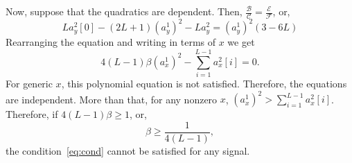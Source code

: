 \documentclass[english,11pt]{article}
\newcommand{\1}{\mathbf{1}}
\numberwithin{equation}{section}
\theoremstyle{plain}
\theoremstyle{definition}
\theoremstyle{remark}
\theoremstyle{plain}
\theoremstyle{remark}
\theoremstyle{plain}
\theoremstyle{plain}
\begin{document}
Now, suppose that the quadratics are dependent. Then, $\frac{\mathcal{B}}{\mathcal{C}} =\frac{\mathcal{E}}{\mathcal{F}} $, or, 	
\begin{equation*}
La_y^2[0] - (2L+1)(a_y^1)^2 - La_y^2 = (a_y^1)^2(3-6L)
\end{equation*}
Rearranging the equation and writing in terms of $x$ we get 
\begin{equation} \label{eq:cond}
4(L-1)\beta (a_x^1)^2  - \sum_{i=1}^{L-1} a_x^2[i] = 0.
\end{equation}	
For generic $x$,  this polynomial equation is not satisfied. Therefore,  the equations are independent. 
More than that, for any nonzero $x$, $(a_x^1)^2 >\sum_{i=1}^{L-1} a_x^2[i]$. Therefore, if $4(L-1)\beta \geq 1$, or,
\begin{equation*}
\beta \geq \frac{1}{4(L-1)},
\end{equation*}
the condition~\eqref{eq:cond} cannot be satisfied for any signal. 
\end{document}
